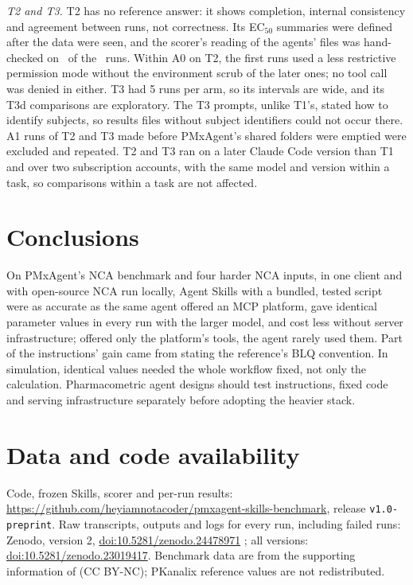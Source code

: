 \documentclass[11pt]{article}
\begin{document}
\emph{T2 and T3.} T2 has no reference answer: it shows completion, internal consistency and agreement between runs, not
correctness. Its EC$_{50}$ summaries were defined after the data were seen, and the scorer's reading of the agents'
files was hand-checked on \numTtwoParserN\ of the \numTtwoRuns\ runs. Within A0 on T2, the first runs used a less
restrictive permission mode without the environment scrub of the later ones; no tool call was denied in either. T3 had
5 runs per arm, so its intervals are wide, and its T3d comparisons are exploratory. The T3 prompts, unlike T1's, stated
how to identify subjects, so results files without subject identifiers could not occur there. A1 runs of T2 and T3 made
before PMxAgent's shared folders were emptied were excluded and repeated. T2 and T3 ran on a later Claude Code version
than T1 and over two subscription accounts, with the same model and version within a task, so comparisons within a task
are not affected.

\section{Conclusions}
On PMxAgent's NCA benchmark and four harder NCA inputs, in one client and with open-source NCA run locally, Agent Skills
with a bundled, tested script were as accurate as the same agent offered an MCP platform, gave identical parameter
values in every run with the larger model, and cost less without server infrastructure; offered only the platform's
tools, the agent rarely used them. Part of the instructions' gain came from stating the reference's BLQ convention. In
simulation, identical values needed the whole workflow fixed, not only the calculation. Pharmacometric agent designs
should test instructions, fixed code and serving infrastructure separately before adopting the heavier stack.

\section*{Data and code availability}
Code, frozen Skills, scorer and per-run results:
\url{https://github.com/heyiamnotacoder/pmxagent-skills-benchmark}, release \texttt{v1.0-preprint}. Raw transcripts, outputs and logs
for every run, including failed runs: Zenodo, version 2, \href{https://doi.org/10.5281/zenodo.24478971}{doi:10.5281/zenodo.24478971}
\cite{zenodo_evidence}; all versions: \href{https://doi.org/10.5281/zenodo.23019417}{doi:10.5281/zenodo.23019417}. Benchmark data are from the supporting information of \cite{bloomingdale2026pmxagent}
(CC BY-NC); PKanalix reference values are not redistributed.
\end{document}
